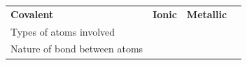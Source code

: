 \begin{enumerate}[noitemsep, label=\textbf{\arabic*}. ]
{\begin{center}
\begin{xtabular*}{\mytablewidth}[t]{|p{10\mystarwidth}|p{10\mystarwidth}|p{10\mystarwidth}|p{10\mystarwidth}|}
    
        \textbf{Covalent} &
    
    
        \textbf{Ionic} &
    
    
        \textbf{Metallic}%
     \tabularnewline{}
    
    
        Types of atoms involved &
    
    
         &
    
    
         &
    
    
     \tabularnewline{}
    
    
        Nature of bond between atoms &
    

\end{xtabular*}
\end{center}}
\end{enumerate}
